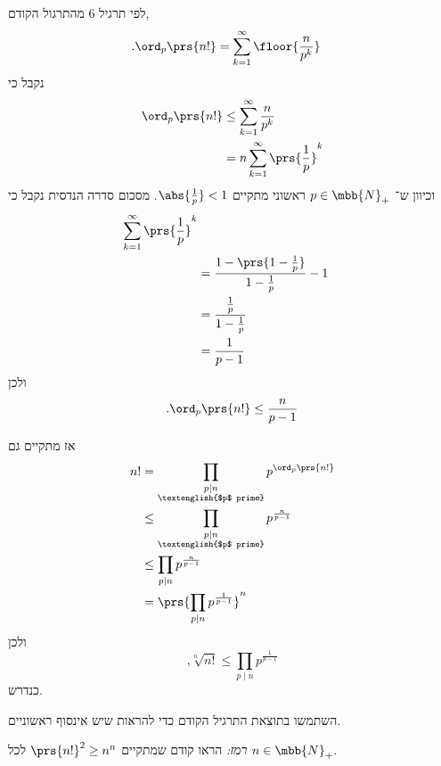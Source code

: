 \documentclass[a4paper,10pt,twoside,openany]{book}
\begin{document}
\begin{solution}
לפי תרגיל 6 מהתרגול הקודם,
\begin{align*}
\text{.} \ord_p\prs{n!} &= \sum_{k = 1}^{\infty} \floor{\frac{n}{p^k}}
\end{align*}
נקבל כי
\begin{align*}
\ord_p\prs{n!} &\leq \sum_{k=1}^{\infty} \frac{n}{p^k}
\\&= n \sum_{k=1}^{\infty} \prs{\frac{1}{p}}^k
\end{align*}
וכיוון ש־%
$p \in \mbb{N}_+$
ראשוני מתקיים
$\abs{\frac{1}{p}} < 1$.
מסכום סדרה הנדסית נקבל כי
\begin{align*}
\sum_{k=1}^{\infty} \prs{\frac{1}{p}}^k
\\&= \frac{1 - \prs{1 - \frac{1}{p}}}{1 - \frac{1}{p}} - 1
\\&= \frac{\frac{1}{p}}{1 - \frac{1}{p}}
\\&= \frac{1}{p - 1}
\end{align*}
ולכן
\[\text{.}\ord_p\prs{n!} \leq \frac{n}{p - 1}\]

אז מתקיים גם
\begin{align*}
n! &= \prod_{\substack{p \mid n \\ \text{\textenglish{$p$ prime}}}} p^{\ord_p\prs{n!}}
\\&\leq
\prod_{\substack{p \mid n \\ \text{\textenglish{$p$ prime}}}} p^{\frac{n}{p-1}}
\\&\leq
\prod_{p \mid n} p^{\frac{n}{p-1}}
\\&=
\prs{\prod_{p \mid n} p^{\frac{1}{p-1}}}^n
\end{align*}
ולכן
\[\text{,} \sqrt[n]{n!} \leq \prod_{p \mid n} p^{\frac{1}{p-1}}\]
כנדרש.
\end{solution}

\begin{exercisechap}
השתמשו בתוצאת התרגיל הקודם כדי להראות שיש אינסוף ראשוניים.

\emph{רמז:}
הראו קודם שמתקיים
$\prs{n!}^2 \geq n^n$
לכל
$n \in \mbb{N}_+$.
\end{exercisechap}
\end{document}
